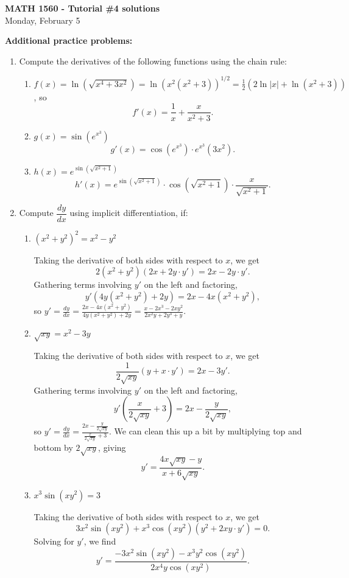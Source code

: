 \documentclass[12pt]{article}
\newcommand{\di}{\displaystyle}
\newcommand{\abs}[1]{\lvert #1\rvert}
\begin{document}
\author{Instructor: Sean Fitzpatrick}
\thispagestyle{empty}
\begin{center}
{\bf MATH 1560 - Tutorial \#4 solutions}\\
Monday, February 5
\end{center}

\textbf{Additional practice problems:}
\begin{enumerate}
\item Compute the derivatives of the following functions using the chain rule:
\begin{enumerate}
\item $f(x) = \ln(\sqrt{x^4+3x^2})=\ln(x^2(x^2+3))^{1/2}=\frac12 (2\ln\abs{x}+\ln(x^2+3))$, so
\[
f'(x) = \frac{1}{x} + \frac{x}{x^2+3}.
\]
\item $\di g(x) = \sin(e^{x^3})$
\[
g'(x) = \cos(e^{x^3})\cdot e^{x^3} (3x^2).
\]
\item $\di h(x) = e^{\sin(\sqrt{x^2+1})}$ 
\[
h'(x) = e^{\sin(\sqrt{x^2+1})}\cdot \cos(\sqrt{x^2+1})\cdot\frac{x}{\sqrt{x^2+1}}.
\]
\end{enumerate}


\item Compute $\dfrac{dy}{dx}$ using implicit differentiation, if:

\begin{enumerate}
\item $(x^2+y^2)^2=x^2-y^2$

Taking the derivative of both sides with respect to $x$, we get
\[
2(x^2+y^2)(2x+2y\cdot y')=2x-2y\cdot y'.
\]
Gathering terms involving $y'$ on the left and factoring, 
\[
y'(4y(x^2+y^2)+2y)=2x-4x(x^2+y^2),
\]
so $\di y'=\frac{dy}{dx} = \frac{2x-4x(x^2+y^2)}{4y(x^2+y^2)+2y} = \frac{x-2x^3-2xy^2}{2x^2y+2y^3+y}$.

\item $\sqrt{xy}=x^2-3y$

Taking the derivative of both sides with respect to $x$, we get
\[
\frac{1}{2\sqrt{xy}}(y+x\cdot y')=2x-3y'.
\]
Gathering terms involving $y'$ on the left and factoring, 
\[
y'\left(\frac{x}{2\sqrt{xy}}+3\right)=2x-\frac{y}{2\sqrt{xy}},
\]
so $\di y' = \frac{dy}{dx} = \frac{2x-\frac{y}{2\sqrt{xy}}}{\frac{x}{2\sqrt{xy}}+3}$. We can clean this up a bit by multiplying top and bottom by $2\sqrt{xy}$, giving
\[
y' = \frac{4x\sqrt{xy}-y}{x+6\sqrt{xy}}.
\]

\item $x^3\sin(xy^2)=3$

Taking the derivative of both sides with respect to $x$, we get
\[
3x^2\sin(xy^2)+x^3\cos(xy^2)(y^2+2xy\cdot y')=0.
\]
Solving for $y'$, we find
\[
y' = \frac{-3x^2\sin(xy^2)-x^3y^2\cos(xy^2)}{2x^4y\cos(xy^2)}.
\]
\end{enumerate}



\end{enumerate}
\end{document}
